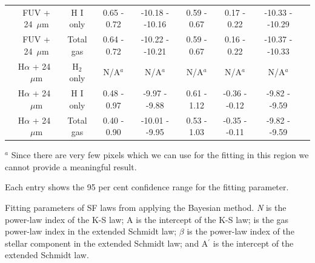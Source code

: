 \begin{table}
\begin{adjustbox}{width=\textwidth}
\begin{tabular}{ccccccccc}
 & FUV + 24~$\mu$m       & H I only    & 0.65 - 0.72 & -10.18 - -10.16  & 0.59 - 0.67    & 0.17 - 0.22    & -10.33 - -10.29     \\
 & FUV + 24~$\mu$m       & Total gas  & 0.64 - 0.72 & -10.22 - -10.21  &  0.59 - 0.67   & 0.16 - 0.22    & -10.37 - -10.33     \\
 & H$\alpha$ + 24~$\mu$m & H$_2$ only &  N/A$^a$ & N/A$^a$ & N/A$^a$ &N/A$^a$ & N/A$^a$     \\
 & H$\alpha$ + 24~$\mu$m & H I only    & 0.48 - 0.97 &  -9.97 - -9.88  & 0.61 - 1.12    & -0.36 - -0.12    & -9.82 - -9.59     \\
 & H$\alpha$ + 24~$\mu$m & Total gas  & 0.40 - 0.90 & -10.01 - -9.95  &  0.53 - 1.03    & -0.35 - -0.11    & -9.82 - -9.59     \\
 \hline 
\end{tabular}
\end{adjustbox}
\begin{tablenotes}
 \item $^a$  Since there are very few pixels which we can use for the fitting in this region we cannot provide a meaningful result.
\item Each entry shows the 95 per cent confidence range for the fitting parameter.
\item Fitting parameters of SF laws from applying the Bayesian method.  {\it N} is the power-law index of the K-S law; A is the intercept of the K-S law; \nprime is the gas power-law index in the extended Schmidt law;
 $\beta$ is the power-law index of the stellar component in the extended Schmidt law; and A$^\prime$ is the intercept of the extended Schmidt law.
\end{tablenotes}

\end{table}

